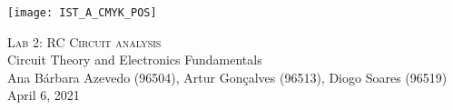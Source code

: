 \thispagestyle {empty}

\texttt{[image: IST\_A\_CMYK\_POS]}

\begin{center}
%
\vspace{1.0cm}

\vspace{3cm}
\textsc{\Huge Lab 2: RC Circuit analysis}\\
\vspace{0.5cm}
{\Large Circuit Theory and Electronics Fundamentals} \\
\vspace{0.8cm}
{\normalsize Ana Bárbara Azevedo (96504), Artur Gonçalves (96513), Diogo Soares (96519)} \\

\vspace{0.5cm}
{April 6, 2021}\\
\end{center}
\vspace{2.5cm}

